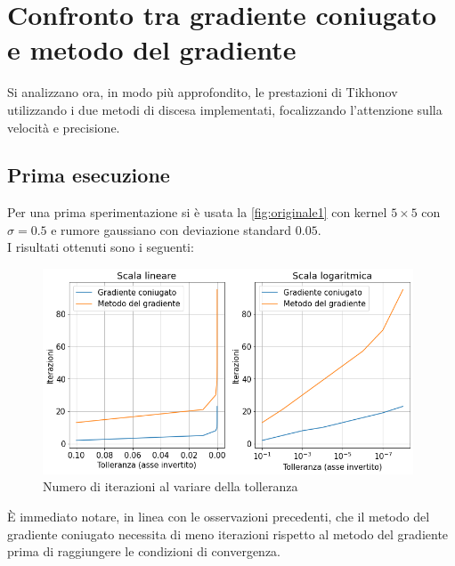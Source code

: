 \documentclass[11pt]{article}
\begin{document}
\newpage
\section{Confronto tra gradiente coniugato e metodo del gradiente}
\label{chap:confronto}
Si analizzano ora, in modo più approfondito, le prestazioni di Tikhonov utilizzando i due metodi di discesa implementati, focalizzando l'attenzione sulla velocità e precisione. \\

\subsection{Prima esecuzione}
Per una prima sperimentazione si è usata la \autoref{fig:originale1} con kernel $5 \times 5$ con $\sigma=0.5$ e rumore gaussiano con deviazione standard $0.05$.\\
I risultati ottenuti sono i seguenti:
\begin{figure}[H]
    \centering
    \includegraphics[width=11cm]{iterazioni_cg_gd/1/tol_iter.png}
    \caption{Numero di iterazioni al variare della tolleranza}
    \label{fig:tol_iter1}
\end{figure}
È immediato notare, in linea con le osservazioni precedenti, che il metodo del gradiente coniugato necessita di meno iterazioni rispetto al metodo del gradiente prima di raggiungere le condizioni di convergenza.\\
\end{document}
